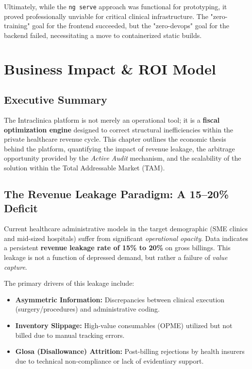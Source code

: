 \documentclass[12pt, openright, twoside, a4paper, english, french, spanish]{abntex2}
\begin{document}
Ultimately, while the \texttt{ng serve} approach was functional for prototyping, it proved professionally unviable for critical clinical infrastructure. The "zero-training" goal for the frontend succeeded, but the "zero-devops" goal for the backend failed, necessitating a move to containerized static builds.

\chapter{Business Impact \& ROI Model}
\label{chap:business_impact}

\section{Executive Summary}
The Intraclinica platform is not merely an operational tool; it is a \textbf{fiscal optimization engine} designed to correct structural inefficiencies within the private healthcare revenue cycle. This chapter outlines the economic thesis behind the platform, quantifying the impact of revenue leakage, the arbitrage opportunity provided by the \textit{Active Audit} mechanism, and the scalability of the solution within the Total Addressable Market (TAM).

\section{The Revenue Leakage Paradigm: A 15--20\% Deficit}

Current healthcare administrative models in the target demographic (SME clinics and mid-sized hospitals) suffer from significant \textit{operational opacity}. Data indicates a persistent \textbf{revenue leakage rate of 15\% to 20\%} on gross billings. This leakage is not a function of depressed demand, but rather a failure of \textit{value capture}.

The primary drivers of this leakage include:
\begin{itemize}
    \item \textbf{Asymmetric Information:} Discrepancies between clinical execution (surgery/procedures) and administrative coding.
    \item \textbf{Inventory Slippage:} High-value consumables (OPME) utilized but not billed due to manual tracking errors.
    \item \textbf{Glosa (Disallowance) Attrition:} Post-billing rejections by health insurers due to technical non-compliance or lack of evidentiary support.
\end{itemize}
\end{document}

